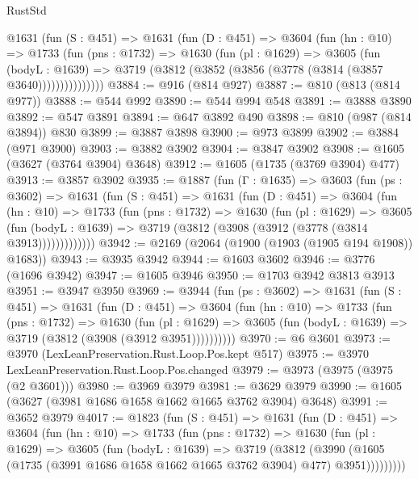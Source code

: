 \begin{lexlean}{RustStd}
\begin{coremodule}
{\begin{coremodule}
{{{{{{{{{{{{{{        @1631
          (fun (S : @451) =>
          @1631
            (fun (D : @451) =>
            @3604
              (fun (hn : @10) =>
              @1733
                (fun (pns : @1732) =>
                @1630
                  (fun (pl : @1629) =>
                  @3605
                    (fun (bodyL : @1639) =>
                    @3719 (@3812 (@3852 (@3856 (@3778 (@3814 (@3857 @3640)))))))))))))))
@3884 := @916 (@814 @927)
@3887 := @810 (@813 (@814 @977))
@3888 := @544 @992
@3890 := @544 @994 @548
@3891 := @3888 @3890
@3892 := @547 @3891
@3894 := @647 @3892 @490
@3898 := @810 (@987 (@814 @3894)) @830
@3899 := @3887 @3898
@3900 := @973 @3899
@3902 := @3884 (@971 @3900)
@3903 := @3882 @3902
@3904 := @3847 @3902
@3908 := @1605 (@3627 (@3764 @3904) @3648)
@3912 := @1605 (@1735 (@3769 @3904) @477)
@3913 := @3857 @3902
@3935 := @1887
    (fun (Γ : @1635) =>
    @3603
      (fun (ps : @3602) =>
      @1631
        (fun (S : @451) =>
        @1631
          (fun (D : @451) =>
          @3604
            (fun (hn : @10) =>
            @1733
              (fun (pns : @1732) =>
              @1630
                (fun (pl : @1629) =>
                @3605
                  (fun (bodyL : @1639) =>
                  @3719 (@3812 (@3908 (@3912 (@3778 (@3814 @3913)))))))))))))
@3942 := @2169 (@2064 (@1900 (@1903 (@1905 @194 @1908)) @1683))
@3943 := @3935 @3942
@3944 := @1603 @3602
@3946 := @3776 (@1696 @3942)
@3947 := @1605 @3946
@3950 := @1703 @3942 @3813 @3913
@3951 := @3947 @3950
@3969 := @3944
    (fun (ps : @3602) =>
    @1631
      (fun (S : @451) =>
      @1631
        (fun (D : @451) =>
        @3604
          (fun (hn : @10) =>
          @1733
            (fun (pns : @1732) =>
            @1630
              (fun (pl : @1629) =>
              @3605 (fun (bodyL : @1639) => @3719 (@3812 (@3908 (@3912 @3951))))))))))
@3970 := @6 @3601
@3973 := @3970 (LexLeanPreservation.Rust.Loop.Pos.kept @517)
@3975 := @3970 LexLeanPreservation.Rust.Loop.Pos.changed
@3979 := @3973 (@3975 (@3975 (@2 @3601)))
@3980 := @3969 @3979
@3981 := @3629 @3979
@3990 := @1605 (@3627 (@3981 @1686 @1658 @1662 @1665 @3762 @3904) @3648)
@3991 := @3652 @3979
@4017 := @1823
    (fun (S : @451) =>
    @1631
      (fun (D : @451) =>
      @3604
        (fun (hn : @10) =>
        @1733
          (fun (pns : @1732) =>
          @1630
            (fun (pl : @1629) =>
            @3605
              (fun (bodyL : @1639) =>
              @3719
                (@3812
                  (@3990
                    (@1605 (@1735 (@3991 @1686 @1658 @1662 @1665 @3762 @3904) @477) @3951)))))))))
}}}}}}}}}}}}}}
\end{coremodule}}
\end{coremodule}
\end{lexlean}
